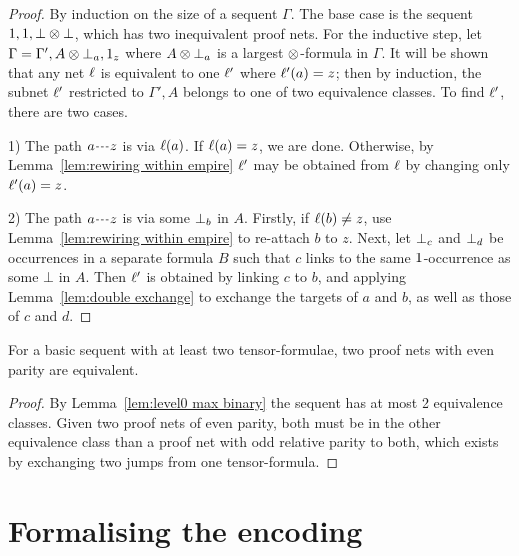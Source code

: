 \documentclass{lmcs}
\begin{document}
\begin{proof}
By induction on the size of a sequent $\Gamma$.
%
The base case is the sequent $1,1,\bot\otimes\bot$, which has two inequivalent proof nets.
%
For the inductive step,
%
let $\Gamma=\Gamma',A\otimes\bot_{a},1_{z}$ where $A\otimes\bot_{a}$ is a largest $\otimes$-formula in $\Gamma$.
%
It will be shown that any net $\ell$ is equivalent to one $\ell'$ where $\ell'(a)=z$; then by induction, the subnet $\ell'$ restricted to $\Gamma',A$ belongs to one of two equivalence classes.
%
To find $\ell'$, there are two cases.

1) The path $\path az$ is via $\ell(a)$.
%
If $\ell(a)=z$, we are done. Otherwise, by Lemma~\ref{lem:rewiring within empire} $\ell'$ may be obtained from $\ell$ by changing only $\ell'(a)=z$.


2) The path $\path az$ is via some $\bot_{b}$ in $A$.
%
Firstly, if $\ell(b)\neq z$, use Lemma~\ref{lem:rewiring within empire} to re-attach $b$ to $z$.
%
Next, let $\bot_{c}$ and $\bot_{d}$ be occurrences in a separate formula $B$ such that $c$ links to the same $1$-occurrence as some $\bot$ in $A$.
%
Then $\ell'$ is obtained by linking $c$ to $b$, and applying Lemma~\ref{lem:double exchange} to exchange the targets of $a$ and $b$, as well as those of $c$ and $d$.
%
\end{proof}




\begin{proposition}
\label{prop:parity determines equivalence}
For a basic sequent with at least two tensor-formulae, two proof nets with even parity are equivalent.
\end{proposition}

\begin{proof}
By Lemma~\ref{lem:level0 max binary} the sequent has at most 2 equivalence classes.
%
Given two proof nets of even parity, both must be in the other equivalence class than a proof net with odd relative parity to both, which exists by exchanging two jumps from one tensor-formula.
\end{proof}





\section{Formalising the encoding}
\label{sec:correctness}
\end{document}
